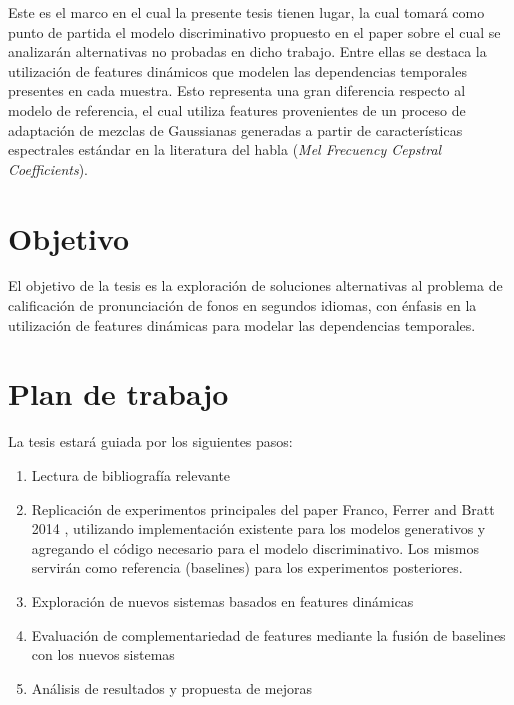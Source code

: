 \documentclass[a4paper,12pt]{article} %
\begin{document}
Este es el marco en el cual la presente tesis tienen lugar, la cual 
tomará como punto de partida el modelo discriminativo propuesto en el paper sobre 
el cual se analizarán alternativas no probadas en dicho trabajo. 
Entre ellas se destaca la utilización de features dinámicos que modelen las dependencias
temporales presentes en cada muestra. Esto representa una gran diferencia 
respecto al modelo de referencia, el cual utiliza features provenientes de un proceso
de adaptación de mezclas de Gaussianas generadas a partir de características
espectrales estándar en la literatura del habla (\textit{Mel Frecuency Cepstral
Coefficients}).


\section{Objetivo}

El objetivo de la tesis es la exploración de soluciones alternativas al problema 
de calificación de pronunciación de fonos en segundos idiomas, con énfasis en 
la utilización de features dinámicas para modelar las dependencias temporales.


\section{Plan de trabajo}

La tesis estará guiada por los siguientes pasos:
\begin{enumerate}
	\item Lectura de bibliografía relevante
	\item Replicación de experimentos principales del paper Franco, Ferrer and Bratt 2014 
	\cite{franco_ferrer_main_paper}, utilizando implementación existente para los modelos
	generativos y agregando el código necesario para el modelo discriminativo. Los mismos servirán como referencia (baselines) para los experimentos posteriores.
	\item Exploraci\'on de nuevos sistemas basados en features din\'amicas
	\item Evaluaci\'on de complementariedad de features mediante la fusi\'on de baselines con los nuevos sistemas
	\item An\'alisis de resultados y propuesta de mejoras
\end{enumerate}

\newpage
\printbibliography
\end{document}
